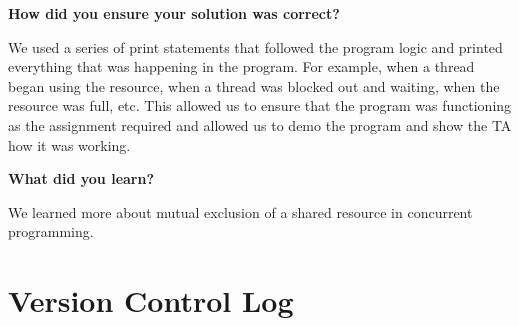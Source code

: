 \documentclass[10pt,letterpaper,draftclsnofoot,onecolumn]{IEEEtran}
\begin{document}
\bigskip

\noindent\textbf{How did you ensure your solution was correct?}
\medskip

\noindent We used a series of print statements that followed the program logic and printed everything that was happening in the program. For example, when a thread began using the resource, when a thread was blocked out and waiting, when the resource was full, etc. This allowed us to ensure that the program was functioning as the assignment required and allowed us to demo the program and show the TA how it was working.\\
\bigskip

\noindent\textbf{What did you learn?}
\medskip

\noindent We learned more about mutual exclusion of a shared resource in concurrent programming.

\pagebreak

\section{Version Control Log}
\bigskip
\end{document}
